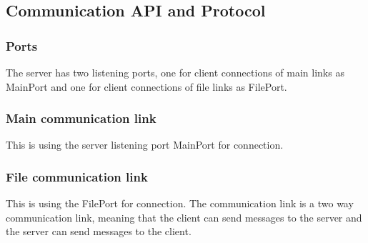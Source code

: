 \subsection{Communication API and Protocol}

\subsubsection{Ports}
The server has two listening ports, one for client connections of main links as MainPort and one for client connections of file links as FilePort.
 
\subsubsection{Main communication link}
This is using the server listening port MainPort for connection. 


\begin{table}
\begin{center}
\end{center}
\caption{Main communication link API messages.}
\label{tab-mainapi}
\end{table}

\subsubsection{File communication link}
This is using the FilePort for connection. The communication link is a two way communication link, meaning that the client can send messages to the server and the server can send messages to the client. 

